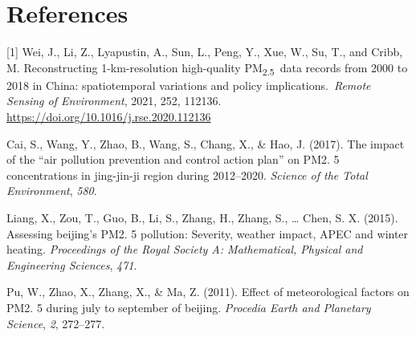 \documentclass[
  12pt,
]{article}
\newlength{\cslhangindent}
\newlength{\cslentryspacingunit} %
\newenvironment{CSLReferences}[2] %
 {%
  \setlength{\parindent}{0pt}
  \ifodd #1
  \let\oldpar\par
  \def\par{\hangindent=\cslhangindent\oldpar}
  \fi
  \setlength{\parskip}{#2\cslentryspacingunit}
 }%
 {}
\begin{document}
\newpage

\hypertarget{references}{%
\section{References}\label{references}}

{[}1{]} Wei, J., Li, Z., Lyapustin, A., Sun, L., Peng, Y., Xue, W., Su,
T., and Cribb, M. Reconstructing 1-km-resolution high-quality
PM\textsubscript{2.5}~data records from 2000 to 2018 in China:
spatiotemporal variations and policy implications.~\emph{Remote Sensing
of Environment}, 2021, 252, 112136.
\url{https://doi.org/10.1016/j.rse.2020.112136}

\hypertarget{refs}{}
\begin{CSLReferences}{1}{0}
\leavevmode{}%
Cai, S., Wang, Y., Zhao, B., Wang, S., Chang, X., \& Hao, J. (2017). The
impact of the {``air pollution prevention and control action plan''} on
PM2. 5 concentrations in jing-jin-ji region during 2012--2020.
\emph{Science of the Total Environment}, \emph{580}.

\leavevmode{}%
Liang, X., Zou, T., Guo, B., Li, S., Zhang, H., Zhang, S., \ldots{}
Chen, S. X. (2015). Assessing beijing's PM2. 5 pollution: Severity,
weather impact, APEC and winter heating. \emph{Proceedings of the Royal
Society A: Mathematical, Physical and Engineering Sciences}, \emph{471}.

\leavevmode{}%
Pu, W., Zhao, X., Zhang, X., \& Ma, Z. (2011). Effect of meteorological
factors on PM2. 5 during july to september of beijing. \emph{Procedia
Earth and Planetary Science}, \emph{2}, 272--277.

\end{CSLReferences}
\end{document}
